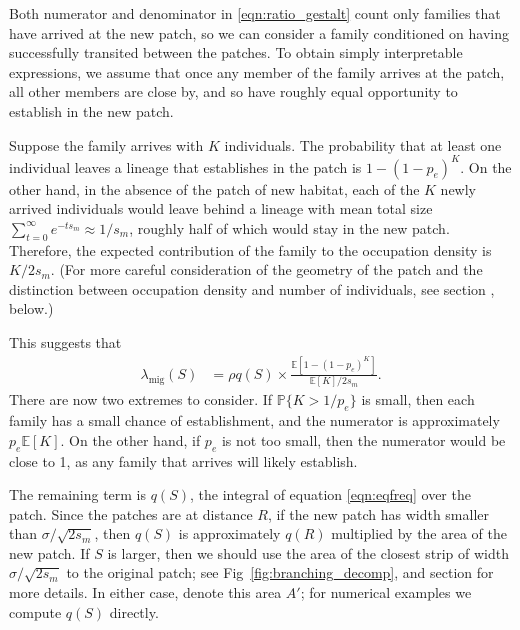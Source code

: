 \documentclass[10pt,letterpaper]{article}
\renewcommand{\P}{\mathbb{P}}
\newcommand{\E}{\mathbb{E}}
\newcommand{\migrate}{\lambda_\text{mig}}
\newcommand{\secref}[1]{{\emph{\nameref{#1}}}}
\begin{document}
Both numerator and denominator in \eqref{eqn:ratio_gestalt} 
count only families that have arrived at the new patch,
so we can consider a family conditioned on having successfully transited between the patches.
To obtain simply interpretable expressions,
we assume that once any member of the family arrives at the patch,
all other members are close by, and so have roughly equal opportunity
to establish in the new patch.

Suppose the family arrives with $K$ individuals.
The probability that at least one individual leaves a lineage that establishes in the patch
is $1-(1-p_e)^K$.
On the other hand, in the absence of the patch of new habitat,
each of the $K$ newly arrived individuals would leave behind a lineage with 
mean total size $\sum_{t=0}^\infty e^{-t s_m} \approx 1/s_m$,
roughly half of which would stay in the new patch.
Therefore, the expected contribution of the family to the occupation density is $K/2s_m$.
(For more careful consideration of the geometry of the patch
and the distinction between occupation density and number of individuals,
see section \secref{ss:hitting_occupation}, below.)

This suggests that 
\begin{align} \label{eqn:ratio_K}
  \migrate(S) 
    &= \rho q(S) \times 
    \frac{
        \E[1-(1-p_e)^K]
    }{
        \E[K]/2s_m
    } .
\end{align}
There are now two extremes to consider.
If $\P\{K>1/p_e\}$ is small, then each family has a small chance of establishment,
and the numerator is approximately $p_e \E[K]$.
On the other hand, if $p_e$ is not too small,
then the numerator would be close to 1, as any family that arrives will likely establish.

The remaining term is $q(S)$, the integral of equation \eqref{eqn:eqfreq} over the patch.
Since the patches are at distance $R$,
if the new patch has width smaller than $\sigma/\sqrt{2s_m}$, 
then $q(S)$ is approximately $q(R)$ multiplied by the area of the new patch.
If $S$ is larger, then we should use the area of the closest strip
of width $\sigma/\sqrt{2s_m}$ to the original patch;
see Fig~\ref{fig:branching_decomp}, and section \secref{apx:qS} for more details.
In either case, denote this area $A'$;
for numerical examples we compute $q(S)$ directly.
\end{document}
